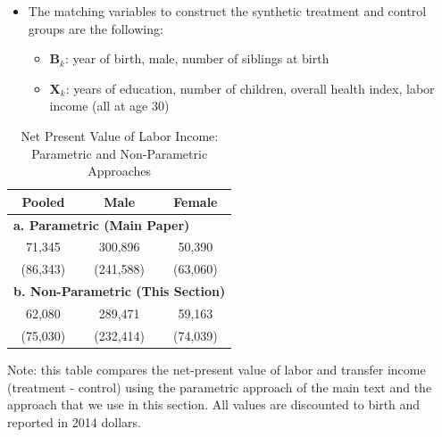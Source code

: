 \documentclass[static]{JJH-Beamer}
\begin{document}
\begin{frame}

\begin{itemize}
\item The matching variables to construct the synthetic treatment and control groups are the following:
    \begin{itemize}
    \item $\bm{B}_k$: year of birth, male, number of siblings at birth
    \item $\bm{X}_k$: years of education, number of children, overall health index, labor income (all at age 30)
    \end{itemize}
\end{itemize}

\end{frame}

\begin{frame}

\begin{table}[H]
\caption{Net Present Value of Labor Income: Parametric and Non-Parametric Approaches}\label{table:nvpli}
\begin{center}
\begin{tabular}{ccc}
\toprule
Pooled & Male & Female   \\
\midrule
\multicolumn{3}{l}{\textbf{a. Parametric (Main Paper)}} \\
71,345 & 300,896 & 50,390 \\
(86,343) & (241,588) & (63,060)\\
\multicolumn{3}{l}{\textbf{b. Non-Parametric (This Section)}} \\
62,080 & 289,471 & 59,163 \\
(75,030) & (232,414) & (74,039) \\
\bottomrule
\end{tabular}
\end{center}
\footnotesize \flushleft
Note: this table compares the net-present value of labor and transfer income (treatment - control) using the parametric approach of the main text and the approach that we use in this section. All values are discounted to birth and reported in 2014 dollars.\\
\end{table}

\end{frame}
\end{document}
